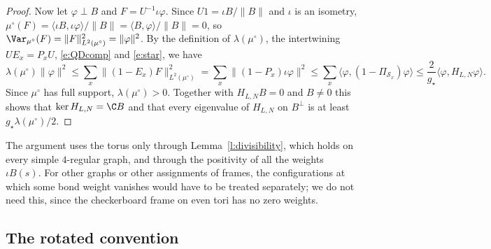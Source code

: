 \begin{proof}
Now let $\varphi \perp B$ and $F = U^{-1} \iota \varphi$. Since $U 1 = \iota B / \|B\|$ and $\iota$ is an isometry, $\mu^\circ(F) = \langle \iota B, \iota \varphi \rangle / \|B\| = \langle B, \varphi \rangle / \|B\| = 0$, so $\Var_{\mu^\circ}(F) = \|F\|^2_{L^2(\mu^\circ)} = \|\varphi\|^2$. By the definition of $\lambda(\mu^\circ)$, the intertwining $U E_x = P_x U$, \eqref{e:QDcomp} and \eqref{e:star}, we have
\begin{equation*}
\lambda(\mu^\circ) \|\varphi\|^2 \le \sum_{x} \|(1 - E_x) F\|^2_{L^2(\mu^\circ)} = \sum_x \|(1 - P_x) \iota \varphi\|^2 \le \sum_x \langle \varphi, (1 - \Pi_{\mathcal S_x}) \varphi \rangle \le \frac{2}{g_\star} \langle \varphi, H_{L, N} \varphi \rangle .
\end{equation*}
Since $\mu^\circ$ has full support, $\lambda(\mu^\circ) > 0$. Together with $H_{L, N} B = 0$ and $B \neq 0$ this shows that $\ker H_{L, N} = \C B$ and that every eigenvalue of $H_{L, N}$ on $B^\perp$ is at least $g_\star \lambda(\mu^\circ)/2$.
\end{proof}

\begin{remark}\label{r:QDgeneral}
The argument uses the torus only through Lemma~\ref{l:divisibility}, which holds on every simple $4$-regular graph, and through the positivity of all the weights $\iota B(s)$. For other graphs or other assignments of frames, the configurations at which some bond weight vanishes would have to be treated separately; we do not need this, since the checkerboard frame on even tori has no zero weights.
\end{remark}

\subsection{The rotated convention}\label{s:rotated}

